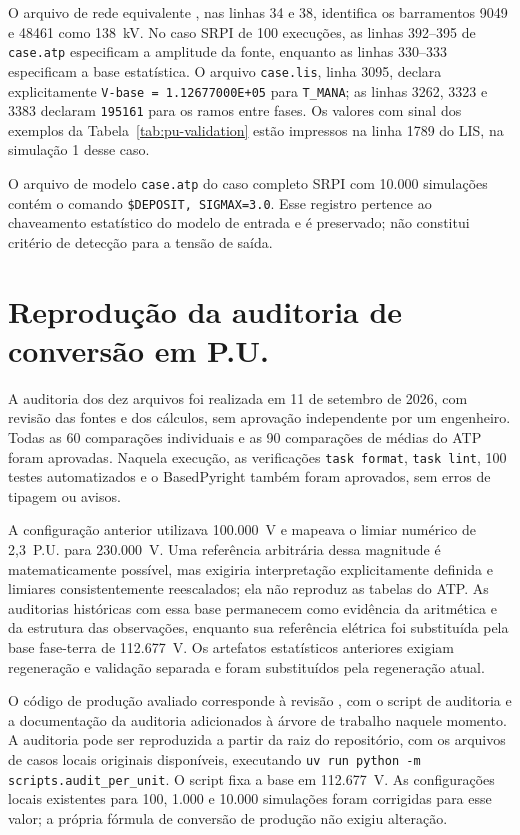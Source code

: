 \documentclass[
	12pt,				%
	openright,			%
	oneside,			%
	a4paper,			%
	chapter=TITLE,		%
	section=TITLE,		%
	subsection=TITLE,	%
	subsubsection=TITLE,%
	english,			%
	brazilian			%
	]{abntex2}
\theoremstyle{definition}
\begin{document}
\begin{apendicesenv}
O arquivo de rede equivalente
, nas linhas 34 e 38,
identifica os barramentos 9049 e 48461 como 138~kV. No caso SRPI de 100
execuções, as linhas 392--395 de \texttt{case.atp} especificam a amplitude
da fonte, enquanto as linhas 330--333 especificam a base estatística.
O arquivo \texttt{case.lis}, linha 3095, declara explicitamente
\texttt{V-base = 1.12677000E+05} para \texttt{T\_MANA}; as linhas 3262,
3323 e 3383 declaram \texttt{195161} para os ramos entre fases.
Os valores com sinal dos exemplos da Tabela~\ref{tab:pu-validation}
estão impressos na linha 1789 do LIS, na simulação 1 desse caso.

O arquivo de modelo \texttt{case.atp} do caso completo SRPI com 10.000
simulações contém o comando \texttt{\$DEPOSIT, SIGMAX=3.0}. Esse registro
pertence ao chaveamento estatístico do modelo de entrada e é preservado;
não constitui critério de detecção para a tensão de saída.

\section{Reprodução da auditoria de conversão em P.U.}
\label{app:auditoria-pu}

A auditoria dos dez arquivos foi realizada em 11 de setembro de 2026,
com revisão das fontes e dos cálculos, sem aprovação independente por um
engenheiro. Todas as 60 comparações individuais e as 90 comparações de
médias do ATP foram aprovadas. Naquela execução, as verificações
\texttt{task format}, \texttt{task lint}, 100 testes automatizados e o
BasedPyright também foram aprovados, sem erros de tipagem ou avisos.

A configuração anterior utilizava 100.000~V e mapeava o limiar numérico de
2,3~P.U. para 230.000~V. Uma referência arbitrária dessa magnitude é
matematicamente possível, mas exigiria interpretação explicitamente
definida e limiares consistentemente reescalados; ela não reproduz as
tabelas do ATP. As auditorias históricas com essa base permanecem como
evidência da aritmética e da estrutura das observações, enquanto sua
referência elétrica foi substituída pela base fase-terra de 112.677~V.
Os artefatos estatísticos anteriores exigiam regeneração e validação
separada e foram substituídos pela regeneração atual.

O código de produção avaliado corresponde à revisão
, com o script de auditoria e
a documentação da auditoria adicionados à árvore de
trabalho naquele momento. A auditoria pode ser reproduzida a partir da raiz do repositório,
com os arquivos de casos locais originais disponíveis, executando
\texttt{uv run python -m scripts.audit\_per\_unit}. O script fixa a base em
112.677~V. As configurações locais existentes para 100, 1.000 e 10.000
simulações foram corrigidas para esse valor; a própria fórmula de conversão
de produção não exigiu alteração.


\end{apendicesenv}
\end{document}
